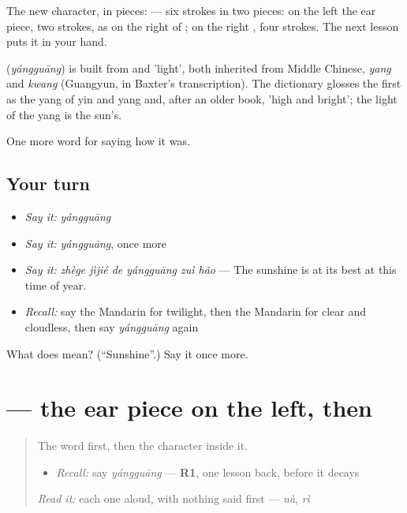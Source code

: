 The new character, in pieces:  — six strokes in two pieces: on the left the ear piece, two strokes, as on the right of ; on the right , four strokes. The next lesson puts it in your hand.

\begin{cousinweb}
\textbf{} (\emph{yángguāng}) is built from  and  'light', both inherited from Middle Chinese, \emph{yang} and \emph{kwang} (Guangyun, in Baxter's transcription). The dictionary glosses the first as the yang of yin and yang and, after an older book, 'high and bright'; the light of the yang is the sun's.
\end{cousinweb}

\begin{grammarlens}[title={What you've built}]
One more word for saying how it was.
\end{grammarlens}

\subsection*{Your turn}
\begin{itemize}
\raggedright
  \item \emph{Say it:} \emph{yángguāng}
  \item \emph{Say it:} \emph{yángguāng}, once more
  \item \emph{Say it:} \emph{zhège jìjié de yángguāng zuì hǎo} — The sunshine is at its best at this time of year.
  \item \emph{Recall:} say the Mandarin for twilight, then the Mandarin for clear and cloudless, then say \emph{yángguāng} again
\end{itemize}

\begin{tcolorbox}[breakable,colback=teal!4,colframe=teal!35!black,title={Before you move on}]
What does  mean? (\textquotedblleft{}Sunshine\textquotedblright{}.) Say it once more.
\end{tcolorbox}
\section[\texorpdfstring{\zh{阳} (yáng)}{阳 (yáng)}]{ — the ear piece on the left, then }

\label{lesson:ZH-W518-yang-sun}



\begin{quote}
The word first, then the character inside it.

\begin{itemize}
\raggedright
  \item \emph{Recall:} say \emph{yángguāng} — \textbf{R1}, one lesson back, before it decays
\end{itemize}

\begin{quote}
 
\end{quote}

\emph{Read it:} each one aloud, with nothing said first — \emph{nà}, \emph{rì}
\end{quote}

